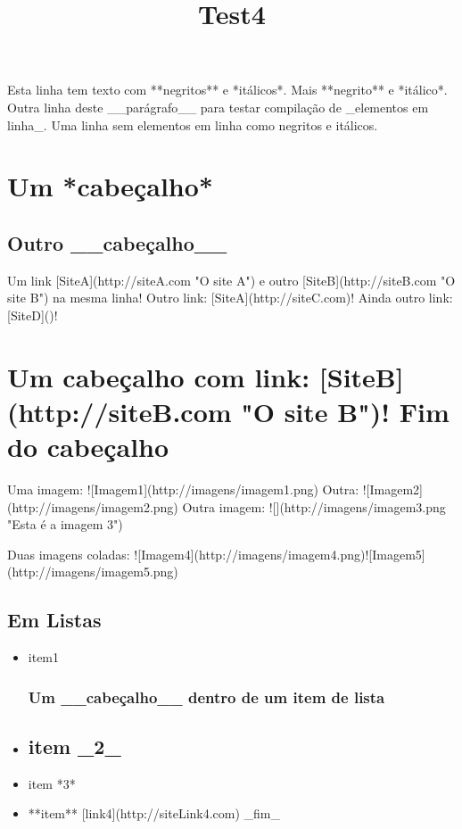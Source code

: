 \documentclass{article}
\title{Test4}
\begin{document}
\maketitle

Esta linha tem texto com **negritos** e *itálicos*. Mais **negrito** e *itálico*.
Outra linha deste __parágrafo__ para testar compilação de _elementos em linha_.  
Uma linha sem elementos em linha como negritos e itálicos.

\section{Um *cabeçalho*}
\subsection{Outro __cabeçalho__}
Um link [SiteA](http://siteA.com "O site A") e outro [SiteB](http://siteB.com "O site B") na mesma linha!
Outro link: [SiteA](http://siteC.com)!
Ainda outro link: [SiteD]()!

\section{Um cabeçalho com link: [SiteB](http://siteB.com "O site B")! Fim do cabeçalho}
Uma imagem: ![Imagem1](http://imagens/imagem1.png) Outra: ![Imagem2](http://imagens/imagem2.png) 
Outra imagem: ![](http://imagens/imagem3.png "Esta é a imagem 3")

Duas imagens coladas: ![Imagem4](http://imagens/imagem4.png)![Imagem5](http://imagens/imagem5.png)

\subsection{Em Listas}
\begin{itemize}
  \item item1\subsubsection{Um __cabeçalho__ dentro de um item de lista}

  \item \subsection{item _2_}

  \item item *3*
  \item **item** [link4](http://siteLink4.com) _fim_
\end{itemize}
\end{document}
